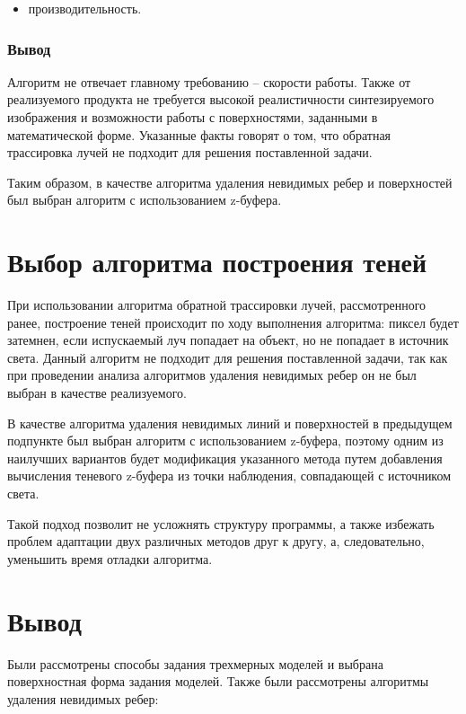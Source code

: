 \documentclass[a4paper,14pt, unknownkeysallowed]{extreport}
\begin{document}
\begin{itemize}
	\item производительность.
\end{itemize}

\subsubsection{Вывод}

Алгоритм не отвечает главному требованию -- скорости работы. Также от реализуемого продукта не требуется высокой реалистичности синтезируемого изображения и возможности работы с поверхностями, заданными в математической форме. Указанные факты говорят о том, что обратная трассировка лучей не подходит для решения поставленной задачи.

Таким образом, в качестве алгоритма удаления невидимых ребер и поверхностей был выбран алгоритм с использованием z-буфера.

\section{Выбор алгоритма построения теней}

При использовании алгоритма обратной трассировки лучей, рассмотренного ранее, построение теней происходит по ходу выполнения алгоритма: пиксел будет затемнен, если испускаемый луч попадает на объект, но не попадает в источник света. Данный алгоритм не подходит для решения поставленной задачи, так как при проведении анализа алгоритмов удаления невидимых ребер он не был выбран в качестве реализуемого.

В качестве алгоритма удаления невидимых линий и поверхностей в предыдущем подпункте был выбран алгоритм с использованием z-буфера, поэтому одним из наилучших вариантов будет модификация указанного метода путем добавления вычисления теневого z-буфера из точки наблюдения, совпадающей с источником света.

Такой подход позволит не усложнять структуру программы, а также избежать проблем адаптации двух различных методов друг к другу, а, следовательно, уменьшить время отладки алгоритма.


\section{Вывод}

Были рассмотрены способы задания трехмерных моделей и выбрана поверхностная форма задания моделей. Также были рассмотрены алгоритмы удаления невидимых ребер: 
\end{document}
